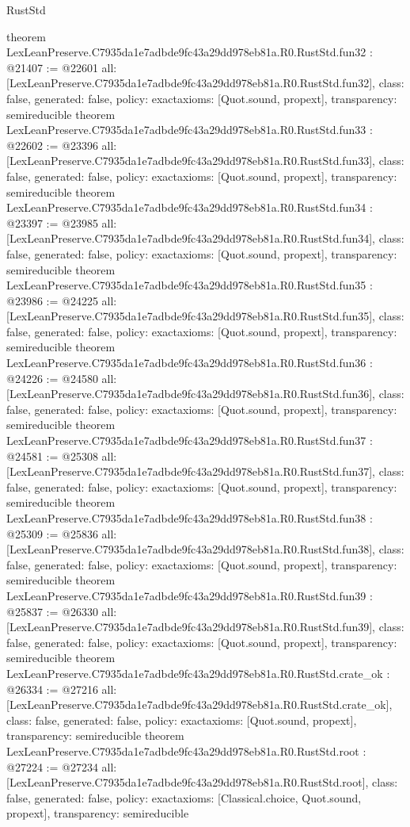 \begin{lexlean}{RustStd}
\begin{coremodule}
{}
theorem LexLeanPreserve.C7935da1e7adbde9fc43a29dd978eb81a.R0.RustStd.fun32 : @21407 := @22601 {
  all: [LexLeanPreserve.C7935da1e7adbde9fc43a29dd978eb81a.R0.RustStd.fun32],
  class: false,
  generated: false,
  policy: exact{axioms: [Quot.sound, propext]},
  transparency: semireducible
}
theorem LexLeanPreserve.C7935da1e7adbde9fc43a29dd978eb81a.R0.RustStd.fun33 : @22602 := @23396 {
  all: [LexLeanPreserve.C7935da1e7adbde9fc43a29dd978eb81a.R0.RustStd.fun33],
  class: false,
  generated: false,
  policy: exact{axioms: [Quot.sound, propext]},
  transparency: semireducible
}
theorem LexLeanPreserve.C7935da1e7adbde9fc43a29dd978eb81a.R0.RustStd.fun34 : @23397 := @23985 {
  all: [LexLeanPreserve.C7935da1e7adbde9fc43a29dd978eb81a.R0.RustStd.fun34],
  class: false,
  generated: false,
  policy: exact{axioms: [Quot.sound, propext]},
  transparency: semireducible
}
theorem LexLeanPreserve.C7935da1e7adbde9fc43a29dd978eb81a.R0.RustStd.fun35 : @23986 := @24225 {
  all: [LexLeanPreserve.C7935da1e7adbde9fc43a29dd978eb81a.R0.RustStd.fun35],
  class: false,
  generated: false,
  policy: exact{axioms: [Quot.sound, propext]},
  transparency: semireducible
}
theorem LexLeanPreserve.C7935da1e7adbde9fc43a29dd978eb81a.R0.RustStd.fun36 : @24226 := @24580 {
  all: [LexLeanPreserve.C7935da1e7adbde9fc43a29dd978eb81a.R0.RustStd.fun36],
  class: false,
  generated: false,
  policy: exact{axioms: [Quot.sound, propext]},
  transparency: semireducible
}
theorem LexLeanPreserve.C7935da1e7adbde9fc43a29dd978eb81a.R0.RustStd.fun37 : @24581 := @25308 {
  all: [LexLeanPreserve.C7935da1e7adbde9fc43a29dd978eb81a.R0.RustStd.fun37],
  class: false,
  generated: false,
  policy: exact{axioms: [Quot.sound, propext]},
  transparency: semireducible
}
theorem LexLeanPreserve.C7935da1e7adbde9fc43a29dd978eb81a.R0.RustStd.fun38 : @25309 := @25836 {
  all: [LexLeanPreserve.C7935da1e7adbde9fc43a29dd978eb81a.R0.RustStd.fun38],
  class: false,
  generated: false,
  policy: exact{axioms: [Quot.sound, propext]},
  transparency: semireducible
}
theorem LexLeanPreserve.C7935da1e7adbde9fc43a29dd978eb81a.R0.RustStd.fun39 : @25837 := @26330 {
  all: [LexLeanPreserve.C7935da1e7adbde9fc43a29dd978eb81a.R0.RustStd.fun39],
  class: false,
  generated: false,
  policy: exact{axioms: [Quot.sound, propext]},
  transparency: semireducible
}
theorem LexLeanPreserve.C7935da1e7adbde9fc43a29dd978eb81a.R0.RustStd.crate_ok : @26334 := @27216 {
  all: [LexLeanPreserve.C7935da1e7adbde9fc43a29dd978eb81a.R0.RustStd.crate_ok],
  class: false,
  generated: false,
  policy: exact{axioms: [Quot.sound, propext]},
  transparency: semireducible
}
theorem LexLeanPreserve.C7935da1e7adbde9fc43a29dd978eb81a.R0.RustStd.root : @27224 := @27234 {
  all: [LexLeanPreserve.C7935da1e7adbde9fc43a29dd978eb81a.R0.RustStd.root],
  class: false,
  generated: false,
  policy: exact{axioms: [Classical.choice, Quot.sound, propext]},
  transparency: semireducible
}


\end{coremodule}
\end{lexlean}
